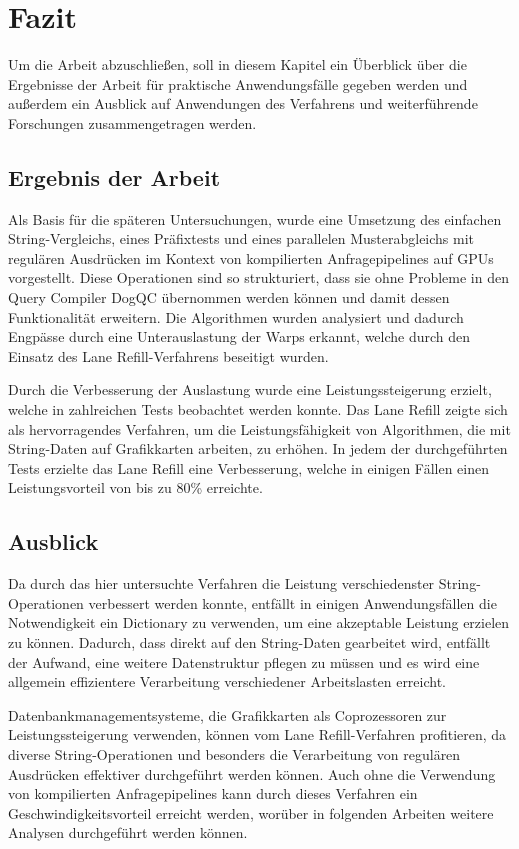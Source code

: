 \chapter{Fazit}

Um die Arbeit abzuschließen, soll in diesem Kapitel ein Überblick über die Ergebnisse der Arbeit für praktische Anwendungsfälle gegeben werden und außerdem ein Ausblick auf Anwendungen des Verfahrens und weiterführende Forschungen zusammengetragen werden.

\section{Ergebnis der Arbeit}

Als Basis für die späteren Untersuchungen, wurde eine Umsetzung des einfachen String-Vergleichs, eines Präfixtests und eines parallelen Musterabgleichs mit regulären Ausdrücken im Kontext von kompilierten Anfragepipelines auf GPUs vorgestellt.
Diese Operationen sind so strukturiert, dass sie ohne Probleme in den Query Compiler DogQC übernommen werden können und damit dessen Funktionalität erweitern.
Die Algorithmen wurden analysiert und dadurch Engpässe durch eine Unterauslastung der Warps erkannt, welche durch den Einsatz des Lane Refill-Verfahrens beseitigt wurden.

Durch die Verbesserung der Auslastung wurde eine Leistungssteigerung erzielt, welche in zahlreichen Tests beobachtet werden konnte.
Das Lane Refill zeigte sich als hervorragendes Verfahren, um die Leistungsfähigkeit von Algorithmen, die mit String-Daten auf Grafikkarten arbeiten, zu erhöhen.
In jedem der durchgeführten Tests erzielte das Lane Refill eine Verbesserung, welche in einigen Fällen einen Leistungsvorteil von bis zu 80\% erreichte.


\section{Ausblick}

Da durch das hier untersuchte Verfahren die Leistung verschiedenster String-Operationen verbessert werden konnte, entfällt in einigen Anwendungsfällen die Notwendigkeit ein Dictionary zu verwenden, um eine akzeptable Leistung erzielen zu können.
Dadurch, dass direkt auf den String-Daten gearbeitet wird, entfällt der Aufwand, eine weitere Datenstruktur pflegen zu müssen und es wird eine allgemein effizientere Verarbeitung verschiedener Arbeitslasten erreicht.

Datenbankmanagementsysteme, die Grafikkarten als Coprozessoren zur Leistungssteigerung verwenden, können vom Lane Refill-Verfahren profitieren, da diverse String-Operationen und besonders die Verarbeitung von regulären Ausdrücken effektiver durchgeführt werden können.
Auch ohne die Verwendung von kompilierten Anfragepipelines kann durch dieses Verfahren ein Geschwindigkeitsvorteil erreicht werden, worüber in folgenden Arbeiten weitere Analysen durchgeführt werden können.


